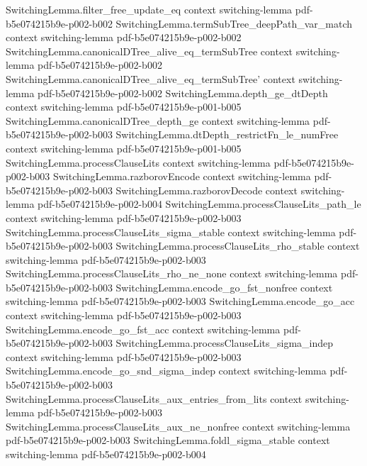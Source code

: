 \begin{theorem}
\proofstep
  {SwitchingLemma.filter_free_update_eq}
  {context}
  {switching-lemma}
  {pdf-b5e074215b9e-p002-b002}
\proofstep
  {SwitchingLemma.termSubTree_deepPath_var_match}
  {context}
  {switching-lemma}
  {pdf-b5e074215b9e-p002-b002}
\proofstep
  {SwitchingLemma.canonicalDTree_alive_eq_termSubTree}
  {context}
  {switching-lemma}
  {pdf-b5e074215b9e-p002-b002}
\proofstep
  {SwitchingLemma.canonicalDTree_alive_eq_termSubTree'}
  {context}
  {switching-lemma}
  {pdf-b5e074215b9e-p002-b002}
\proofstep
  {SwitchingLemma.depth_ge_dtDepth}
  {context}
  {switching-lemma}
  {pdf-b5e074215b9e-p001-b005}
\proofstep
  {SwitchingLemma.canonicalDTree_depth_ge}
  {context}
  {switching-lemma}
  {pdf-b5e074215b9e-p002-b003}
\proofstep
  {SwitchingLemma.dtDepth_restrictFn_le_numFree}
  {context}
  {switching-lemma}
  {pdf-b5e074215b9e-p001-b005}
\proofstep
  {SwitchingLemma.processClauseLits}
  {context}
  {switching-lemma}
  {pdf-b5e074215b9e-p002-b003}
\proofstep
  {SwitchingLemma.razborovEncode}
  {context}
  {switching-lemma}
  {pdf-b5e074215b9e-p002-b003}
\proofstep
  {SwitchingLemma.razborovDecode}
  {context}
  {switching-lemma}
  {pdf-b5e074215b9e-p002-b004}
\proofstep
  {SwitchingLemma.processClauseLits_path_le}
  {context}
  {switching-lemma}
  {pdf-b5e074215b9e-p002-b003}
\proofstep
  {SwitchingLemma.processClauseLits_sigma_stable}
  {context}
  {switching-lemma}
  {pdf-b5e074215b9e-p002-b003}
\proofstep
  {SwitchingLemma.processClauseLits_rho_stable}
  {context}
  {switching-lemma}
  {pdf-b5e074215b9e-p002-b003}
\proofstep
  {SwitchingLemma.processClauseLits_rho_ne_none}
  {context}
  {switching-lemma}
  {pdf-b5e074215b9e-p002-b003}
\proofstep
  {SwitchingLemma.encode_go_fst_nonfree}
  {context}
  {switching-lemma}
  {pdf-b5e074215b9e-p002-b003}
\proofstep
  {SwitchingLemma.encode_go_acc}
  {context}
  {switching-lemma}
  {pdf-b5e074215b9e-p002-b003}
\proofstep
  {SwitchingLemma.encode_go_fst_acc}
  {context}
  {switching-lemma}
  {pdf-b5e074215b9e-p002-b003}
\proofstep
  {SwitchingLemma.processClauseLits_sigma_indep}
  {context}
  {switching-lemma}
  {pdf-b5e074215b9e-p002-b003}
\proofstep
  {SwitchingLemma.encode_go_snd_sigma_indep}
  {context}
  {switching-lemma}
  {pdf-b5e074215b9e-p002-b003}
\proofstep
  {SwitchingLemma.processClauseLits_aux_entries_from_lits}
  {context}
  {switching-lemma}
  {pdf-b5e074215b9e-p002-b003}
\proofstep
  {SwitchingLemma.processClauseLits_aux_ne_nonfree}
  {context}
  {switching-lemma}
  {pdf-b5e074215b9e-p002-b003}
\proofstep
  {SwitchingLemma.foldl_sigma_stable}
  {context}
  {switching-lemma}
  {pdf-b5e074215b9e-p002-b004}

\end{theorem}
